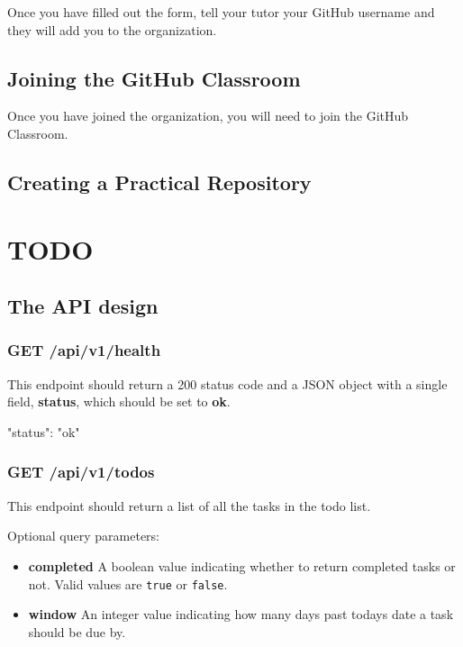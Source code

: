 \documentclass{csse4400}
\begin{document}
Once you have filled out the form,
tell your tutor your GitHub username and they will add you to the organization.

\subsection{Joining the GitHub Classroom}
Once you have joined the organization,
you will need to join the GitHub Classroom.


\subsection{Creating a Practical Repository}

\section{TODO}

\subsection{The API design}

\subsubsection{GET /api/v1/health}
This endpoint should return a 200 status code and a JSON object with a single field, \textbf{status}, which should be set to \textbf{ok}.


\begin{code}[language=json,numbers=none]{}
  {
    "status": "ok"
  }
\end{code}

\subsubsection{GET /api/v1/todos}
This endpoint should return a list of all the tasks in the todo list.

Optional query parameters:
\begin{itemize}
\item \textbf{completed} A boolean value indicating whether to return completed tasks or not. Valid values are \texttt{true} or \texttt{false}.
  \item\textbf{window} An integer value indicating how many days past todays date a task should be due by.
\end{itemize}
\end{document}
